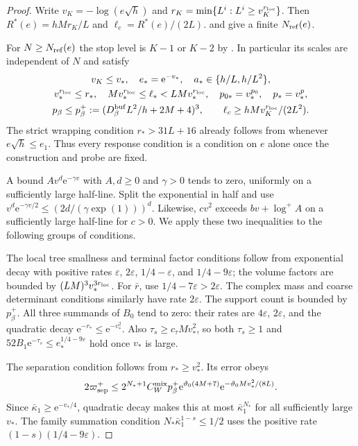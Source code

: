 \begin{proof}
Write
$v_K=-\log(e\sqrt h)$ and
$r_K=\min\{L^i:L^i\ge v_K^{r_{\rm loc}}\}$.
Then $R^*(e)=hMr_K/L$ and
$\ell_c=R^*(e)/(2L)$.
\cite[Proposition~6.1]{CoverTuning} and
\cite[(53)]{CoverTuning} give
a finite $N_{\rm ref}(e)$.

For $N\ge N_{\rm ref}(e)$ the stop level
is $K-1$ or $K-2$ by
\cite[(54)]{CoverTuning}. In particular its
scales are independent of $N$ and satisfy
\begin{gather}
 v_K\le v_*,\quad e_*=\mathrm e^{-v_*},\quad
 a_*\in\{h/L,h/L^2\},\notag\\
 v_*^{r_{\rm loc}}\le r_*,\quad
 Mv_*^{r_{\rm loc}}\le\ell_*<LMv_*^{r_{\rm loc}},
 \quad p_{0*}=v_*^{p_0},\quad p_*=v_*^p,\notag\\
 p_\beta\le p_\beta^+:=
                (D_\beta^{\rm buf}L^2/h+2M+4)^3,\qquad
 \ell_c\ge hMv_K^{r_{\rm loc}}/(2L^2).
                                  \label{eq:interacting-threshold-scales}
\end{gather}
The strict wrapping condition $r_*>31L+16$
already follows from \cite[(50)]{CoverTuning}
whenever $e\sqrt h\le e_1$.
Thus every response condition is a condition
on $e$ alone once the construction and probe
are fixed.

A bound $A v^d \mathrm e^{-\gamma v}$
with $A,d\ge0$ and $\gamma>0$ tends to zero,
uniformly on a sufficiently large half-line.
Split the exponential in half and use
$v^d\mathrm e^{-\gamma v/2}\le(2d/(\gamma\exp(1)))^d$.
Likewise, $cv^2$ exceeds $bv+\log^+A$
on a sufficiently large half-line for
$c>0$. We apply these two inequalities to
the following groups of conditions.

The local tree smallness and terminal factor
conditions follow from exponential decay
with positive rates
$\varepsilon$, $2\varepsilon$,
$1/4-\varepsilon$, and $1/4-9\varepsilon$;
the volume factors are bounded by
$(LM)^3v_*^{3r_{\rm loc}}$.
For $\bar r$, use
$1/4-7\varepsilon>2\varepsilon$.
The complex mass and coarse determinant
conditions similarly have rate $2\varepsilon$.
The support count is bounded by $p_\beta^+$.
All three summands of $B_0$ tend to zero:
their rates are $4\varepsilon$, $2\varepsilon$,
and the quadratic decay $\mathrm e^{-r_*}\le \mathrm e^{-v_*^2}$.
Also $\tau_s\ge c_\tau Mv_*^2$, so both
$\tau_s\ge1$ and
$52B_1\mathrm e^{-\tau_s}\le e_*^{1/4-9\varepsilon}$
hold once $v_*$ is large.

The separation condition follows from
$r_*\ge v_*^2$. Its error obeys
\[
 2\varpi_{\rm sep}^+
 \le2^{N_*+1}C_W^{\mathrm{mix}}p_\beta^+
          \mathrm e^{\vartheta_0(4M+7)}
          \mathrm e^{-\vartheta_0Mv_*^2/(8L)} .
\]
Since $\bar\kappa_1\ge \mathrm e^{-v_*/4}$,
quadratic decay makes this at most
$\bar\kappa_1^{N_*}$ for all sufficiently
large $v_*$. The family summation condition
$N_*\bar\kappa_1^{1-s}\le1/2$
uses the positive rate
$(1-s)(1/4-9\varepsilon)$.


\end{proof}
